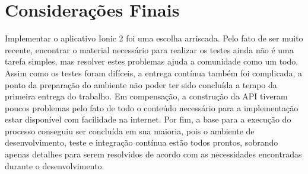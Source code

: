 \section{Considerações Finais}
Implementar o aplicativo Ionic 2 foi uma escolha arriscada. Pelo fato de ser muito recente, encontrar o material necessário para realizar os testes ainda não é uma tarefa simples, mas resolver estes problemas ajuda a comunidade como um todo. Assim como os testes foram difíceis, a entrega contínua também foi complicada, a ponto da preparação do ambiente não poder ter sido concluída a tempo da primeira entrega do trabalho. Em compensação, a construção da API tiveram poucos problemas pelo fato de todo o conteúdo necessário para a implementação estar disponível com facilidade na internet. Por fim, a base para a execução do processo conseguiu ser concluída em sua maioria, pois o ambiente de desenvolvimento, teste e integração contínua estão todos prontos, sobrando apenas detalhes para serem resolvidos de acordo com as necessidades encontradas durante o desenvolvimento.

